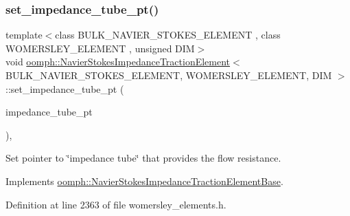 \subsubsection{\texorpdfstring{set\+\_\+impedance\+\_\+tube\+\_\+pt()}{set\_impedance\_tube\_pt()}}
{\footnotesize\ttfamily template$<$class B\+U\+L\+K\+\_\+\+N\+A\+V\+I\+E\+R\+\_\+\+S\+T\+O\+K\+E\+S\+\_\+\+E\+L\+E\+M\+E\+NT , class W\+O\+M\+E\+R\+S\+L\+E\+Y\+\_\+\+E\+L\+E\+M\+E\+NT , unsigned D\+IM$>$ \\
void \hyperlink{classoomph_1_1NavierStokesImpedanceTractionElement}{oomph\+::\+Navier\+Stokes\+Impedance\+Traction\+Element}$<$ B\+U\+L\+K\+\_\+\+N\+A\+V\+I\+E\+R\+\_\+\+S\+T\+O\+K\+E\+S\+\_\+\+E\+L\+E\+M\+E\+NT, W\+O\+M\+E\+R\+S\+L\+E\+Y\+\_\+\+E\+L\+E\+M\+E\+NT, D\+IM $>$\+::set\+\_\+impedance\+\_\+tube\+\_\+pt (\begin{DoxyParamCaption}\item[{\hyperlink{classoomph_1_1TemplateFreeWomersleyImpedanceTubeBase}{Template\+Free\+Womersley\+Impedance\+Tube\+Base} $\ast$}]{impedance\+\_\+tube\+\_\+pt }\end{DoxyParamCaption})\hspace{0.3cm}{\ttfamily [inline]}, {\ttfamily [virtual]}}



Set pointer to \char`\"{}impedance tube\char`\"{} that provides the flow resistance. 



Implements \hyperlink{classoomph_1_1NavierStokesImpedanceTractionElementBase_add9c7ae3f33b8e03805c256daf038ab4}{oomph\+::\+Navier\+Stokes\+Impedance\+Traction\+Element\+Base}.



Definition at line 2363 of file womersley\+\_\+elements.\+h.

\mbox{\label{classoomph_1_1NavierStokesImpedanceTractionElement_aa1738496ef280139a8bd1dbda979d8b1}} 
